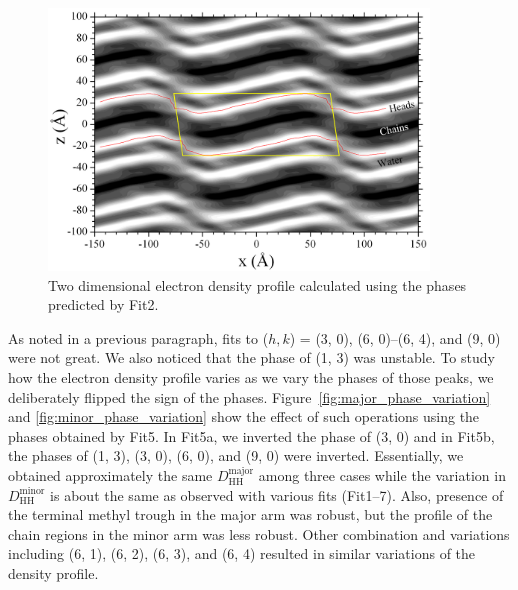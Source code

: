 \begin{figure}[htbp]
  \centering
  \includegraphics[width=0.9\textwidth]{figures/ripple/LAXS/Fit2_2D_edp}
  \caption[Two dimensional electron density profile calculated using the phases
  predicted by the 2G hybrid model (Fit2)]
  {Two dimensional electron density profile calculated using the phases
  predicted by Fit2.}
  \label{fig:Fit2_2D_edp}
\end{figure}

As noted in a previous paragraph, fits to ($h, k$) = (3, 0), (6, 0)--(6, 4),
and (9, 0) were not great. We also noticed that the phase of (1, 3) was unstable. To study
how the electron density profile varies as we vary the phases of those peaks,
we deliberately flipped the sign of the phases. Figure~\ref{fig:major_phase_variation}
and \ref{fig:minor_phase_variation} show the effect of such operations
using the phases obtained by Fit5. 
In Fit5a, we inverted the phase of (3, 0) and in Fit5b, the phases of 
(1, 3), (3, 0), (6, 0), and (9, 0) were inverted.
Essentially, we obtained approximately the same $D_\text{HH}^\text{major}$
among three cases while the variation in $D_\text{HH}^\text{minor}$ is
about the same as observed with various fits (Fit1--7).
Also, presence of the terminal methyl trough in the major arm was robust, but
the profile of the chain regions in the minor arm was less robust.
Other combination and variations including (6, 1), (6, 2), (6, 3), and (6, 4)
resulted in similar variations of the density profile.

